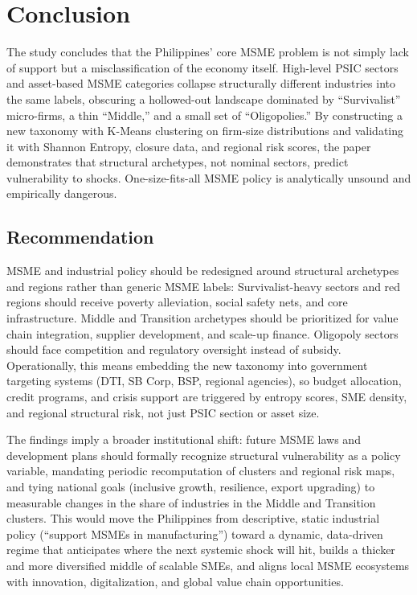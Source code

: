 \documentclass[acmtog, nonacm]{acmart}
\begin{document}
\section{Conclusion}
    The study concludes that the Philippines' core MSME problem is not simply lack of support but a misclassification of the economy itself. High-level PSIC sectors and asset-based MSME categories collapse structurally different industries into the same labels, obscuring a hollowed-out landscape dominated by ``Survivalist'' micro-firms, a thin ``Middle,'' and a small set of ``Oligopolies.'' By constructing a new taxonomy with K-Means clustering on firm-size distributions and validating it with Shannon Entropy, closure data, and regional risk scores, the paper demonstrates that structural archetypes, not nominal sectors, predict vulnerability to shocks. One-size-fits-all MSME policy is analytically unsound and empirically dangerous.

\subsection{Recommendation}
 MSME and industrial policy should be redesigned around structural archetypes and regions rather than generic MSME labels: Survivalist-heavy sectors and red regions should receive poverty alleviation, social safety nets, and core infrastructure. Middle and Transition archetypes should be prioritized for value chain integration, supplier development, and scale-up finance. Oligopoly sectors should face competition and regulatory oversight instead of subsidy. Operationally, this means embedding the new taxonomy into government targeting systems (DTI, SB Corp, BSP, regional agencies), so budget allocation, credit programs, and crisis support are triggered by entropy scores, SME density, and regional structural risk, not just PSIC section or asset size.

The findings imply a broader institutional shift: future MSME laws and development plans should formally recognize structural vulnerability as a policy variable, mandating periodic recomputation of clusters and regional risk maps, and tying national goals (inclusive growth, resilience, export upgrading) to measurable changes in the share of industries in the Middle and Transition clusters. This would move the Philippines from descriptive, static industrial policy (“support MSMEs in manufacturing”) toward a dynamic, data-driven regime that anticipates where the next systemic shock will hit, builds a thicker and more diversified middle of scalable SMEs, and aligns local MSME ecosystems with innovation, digitalization, and global value chain opportunities.
\end{document}
